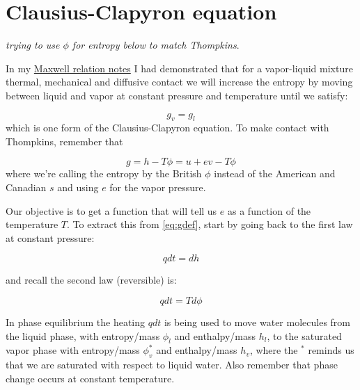 \documentclass[12pt]{article}
\begin{document}
\newcommand{\vect}[1]{\boldsymbol{\vec{#1}}}
\pagestyle{first}


\section{Clausius-Clapyron equation}
\label{sec:day-8-continued}

\textit{trying to use $\phi$ for entropy below to match Thompkins}.

In my
\href{https://www.dropbox.com/scl/fi/puuzbbzszhue73nrew726/maxwell.pdf?rlkey=fntdkgs90o4otc3s6lme85mz3&dl=0}%
{Maxwell relation notes}
I had demonstrated that for a vapor-liquid mixture thermal, mechanical and diffusive contact
we will increase the entropy by moving between liquid and vapor at constant pressure and temperature until we satisfy:

\begin{equation}
  \label{eq:gibbs1}
  g_v = g_l
\end{equation}
which is one form of the Clausius-Clapyron equation.  To make contact with Thompkins, remember that

\begin{equation}
  \label{eq:gdef}
  g = h - T \phi = u + ev - T\phi
\end{equation}
where we're calling the entropy by the British $\phi$ instead of the American and Canadian $s$ and using $e$ for the
vapor pressure.

Our objective is to get a function that will tell us $e$ as a function of the temperature $T$.  To extract this from
\eqref{eq:gdef}, start by going back to the first law at constant pressure:

\begin{equation}
  \label{eq:first}
  q dt = dh
\end{equation}

and recall the second law (reversible) is:

\begin{equation}
  \label{eq:second}
  q dt = T d \phi
\end{equation}

In phase equilibrium the heating $q dt$ is being used to move water molecules
from the liquid phase, with entropy/mass $\phi_l$ and enthalpy/mass $h_l$, 
to the saturated vapor phase
with entropy/mass $\phi_v^*$ and enthalpy/mass $h_v$, where the $^*$ 
reminds us that we are saturated with respect
to liquid water.  Also remember that phase change occurs at constant temperature.
\end{document}

